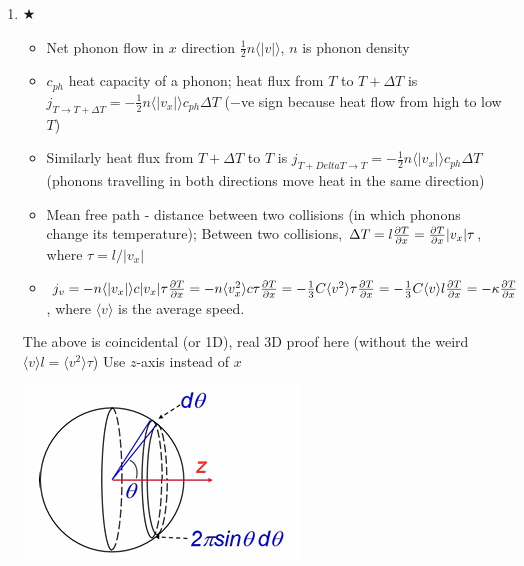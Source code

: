 \documentclass{article}
\theoremstyle{remark}
\theoremstyle{remark}
\newcommand{\myref}[1]{\hyperref[back:#1]{$\bigstar$}\label{#1}}
\begin{document}
\begin{enumerate}
    \item \myref{thm:thermal_conductiv}\begin{itemize}
            \item Net phonon flow in $x$ direction $\frac{1}{2}n\langle|v|\rangle$, $n$ is phonon density
            \item $c_{ph}$ heat capacity of a phonon; heat flux from $T$ to $T+\Delta T$ is $j_{T\rightarrow T+\Delta T}=-\frac{1}{2}n\langle|v_x|\rangle c_{ph}\Delta T$ ($-$ve sign because heat flow from high to low $T$)
            \item Similarly heat flux from $T+\Delta T$ to $T$ is $j_{T+Delta T\rightarrow T}=-\frac{1}{2}n\langle|v_x|\rangle c_{ph}\Delta T$ (phonons travelling in both directions move heat in the same direction)
            \item Mean free path - distance between two collisions (in which phonons change its temperature); Between two collisions, $\Delta T=l\pdv{T}{x} = \pdv{T}{x}|v_x|\tau$, where $\tau=l/|v_x|$
            \item $j_v = -n\langle |v_x|\rangle c|v_x|\tau\pdv{T}{x} = -n\langle v_x^2\rangle c\tau\pdv{T}{x} = -\frac{1}{3}C\langle v^2\rangle\tau \pdv{T}{x} = -\frac{1}{3}C\langle v\rangle l\pdv{T}{x} = -\kappa\pdv{T}{x}$, where $\langle v\rangle$ is the average speed.
        \end{itemize}
        The above is coincidental (or 1D), real 3D proof here (without the weird $\langle v\rangle l=\langle v^2\rangle\tau$)\newline
        Use $z$-axis instead of $x$\newline
        \begin{minipage}{0.3\linewidth}
            \includegraphics*[width=\linewidth]{cmp_thermal_conductivity.png}

\end{minipage}
\end{enumerate}
\end{document}
